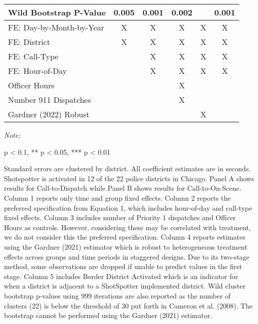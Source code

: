 \begin{table}[H]
\begin{threeparttable}
\begin{tabular}[t]{lccccc}
\hspace{1em}Wild Bootstrap P-Value & 0.005 & 0.001 & 0.002 &  & 0.001\\
\midrule
FE: Day-by-Month-by-Year & X & X & X & X & X\\
FE: District & X & X & X & X & X\\
FE: Call-Type &  & X & X & X & X\\
FE: Hour-of-Day &  & X & X & X & X\\
Officer Hours &  &  & X &  & \\
Number 911 Dispatches &  &  & X &  & \\
Gardner (2022) Robust &  &  &  & X & \\
\bottomrule
\end{tabular}
\begin{tablenotes}
\item \textit{Note: } 
\item * p < 0.1, ** p < 0.05, *** p < 0.01
\item Standard errors are clustered by district. All                      coefficient estimates are in seconds.                  Shotspotter is activated in 12 of the 22 police districts in Chicago.                  Panel A shows results for Call-to-Dispatch while                  Panel B shows results for Call-to-On-Scene. Column 1 reports                  only time and group fixed effects. Column 2 reports the preferred                  specification from Equation 1, which includes hour-of-day and                  call-type fixed effects. Column 3 includes number of Priority 1 dispatches and                  Officer Hours as controls. However, considering these may be correlated with treatment,                  we do not consider this the preferred specification.                  Column 4 reports estimates using                  the Gardner (2021) estimator which is robust to                   heterogeneous treatment effects across groups and time periods                  in staggered designs. Due to its two-stage method, some observations are dropped if                  unable to predict values in the first stage. Column 5 includes Border District Activated                  which is an indicator for when a district is adjacent to a ShotSpotter                  implemented district. Wild cluster bootstrap p-values using 999 iterations are also reported                  as the number of clusters (22) is below the threshold of 30 put forth in                  Cameron et al. (2008). The bootstrap cannot be performed using the Gardner (2021) estimator.                                    
\end{tablenotes}
\end{threeparttable}
\end{table}
